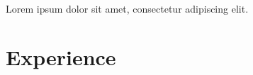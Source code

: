 \documentclass{vitae}
\begin{document}
\begin{masthead}
  Lorem ipsum dolor sit amet, consectetur adipiscing elit.
\end{masthead}
\section{Experience}
\end{document}
